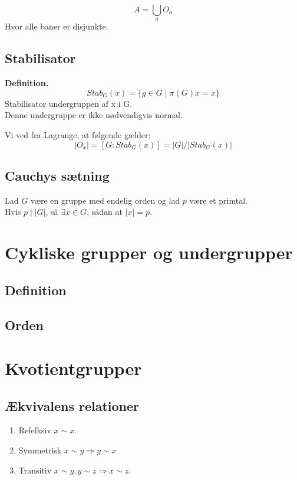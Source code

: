 \documentclass[11pt]{article}
\begin{document}
$$A = \bigcup_a O_a$$
Hvor alle baner er disjunkte.

\subsection*{Stabilisator}
\textbf{Definition.}\\
$$Stab_G(x) = \{ g \in G \mid \pi(G)x = x \}$$
Stabilisator undergruppen af x i G.\\
Denne undergruppe er ikke nødvendigvis normal.

Vi ved fra Lagrange, at følgende gælder:\\
$$|O_x| = [G : Stab_G(x)] = |G| / |Stab_G(x)|$$

\subsection*{Cauchys sætning}
Lad $G$ være en gruppe med endelig orden og lad $p$ være et primtal.\\
Hvis $p \mid |G|$, så $\exists{x \in G}$, sådan at $|x| = p$.

\section*{Cykliske grupper og undergrupper}
\subsection*{Definition}


\subsection*{Orden}

\section*{Kvotientgrupper}
\subsection*{Ækvivalens relationer}

\begin{enumerate}
  \item Refelksiv $x \sim x$.
  \item Symmetrisk $x \sim y \Rightarrow y \sim x$
  \item Transitiv $x \sim y, y \sim z \Rightarrow x \sim z$.
\end{enumerate}
\end{document}
